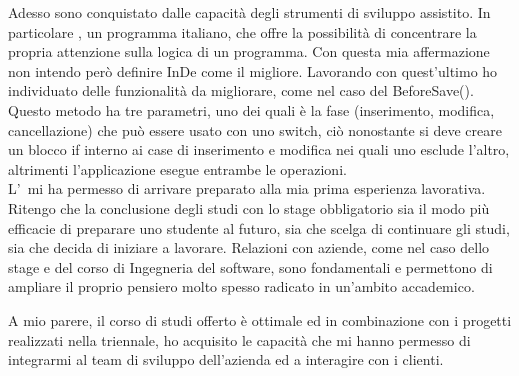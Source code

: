 Adesso sono conquistato dalle capacità degli strumenti di sviluppo assistito. In particolare \inde, un programma italiano, che offre la possibilità di concentrare la propria attenzione sulla logica di un programma.  
Con questa mia affermazione non intendo però definire InDe come il migliore. Lavorando con quest'ultimo ho individuato delle funzionalità da migliorare, come nel caso del BeforeSave(). Questo metodo ha tre parametri, uno dei quali è la fase (inserimento, modifica, cancellazione) che può essere usato con uno switch, ciò nonostante si deve creare un blocco if interno ai case di inserimento e modifica nei quali uno esclude l'altro, altrimenti l'applicazione esegue entrambe le operazioni.\\

L'\myUni\ mi ha permesso di arrivare preparato alla mia prima esperienza lavorativa. Ritengo che la conclusione degli studi con lo stage obbligatorio sia il modo più efficacie di preparare uno studente al futuro, sia che scelga di continuare gli studi, sia che decida di iniziare a lavorare. Relazioni con aziende, come nel caso dello stage e del corso di Ingegneria del software, sono fondamentali e permettono di ampliare il proprio pensiero molto spesso radicato in un'ambito accademico. 

A mio parere, il corso di studi offerto è ottimale ed in combinazione con i progetti realizzati nella triennale, ho acquisito le capacità che mi hanno permesso di integrarmi al team di sviluppo dell'azienda ed a interagire con i clienti. 
 
